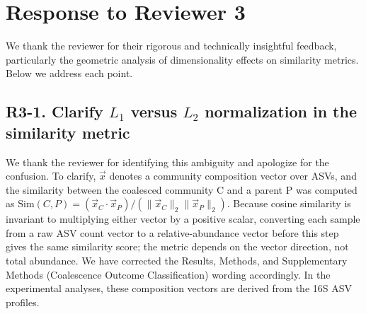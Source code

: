\section*{Response to Reviewer 3}

We thank the reviewer for their rigorous and technically insightful feedback, particularly the geometric analysis of dimensionality effects on similarity metrics. Below we address each point.

\subsection*{R3-1. Clarify $L_1$ versus $L_2$ normalization in the similarity metric}


\responselabel
We thank the reviewer for identifying this ambiguity and apologize for the confusion. To clarify, $\vec{x}$ denotes a community composition vector over ASVs, and the similarity between the coalesced community C and a parent P was computed as $\mathrm{Sim}(C,P) = (\vec{x}_C \cdot \vec{x}_P)/(\|\vec{x}_C\|_2\|\vec{x}_P\|_2)$. Because cosine similarity is invariant to multiplying either vector by a positive scalar, converting each sample from a raw ASV count vector to a relative-abundance vector before this step gives the same similarity score; the metric depends on the vector direction, not total abundance. We have corrected the Results, Methods, and Supplementary Methods (Coalescence Outcome Classification) wording accordingly. In the experimental analyses, these composition vectors are derived from the 16S ASV profiles.


